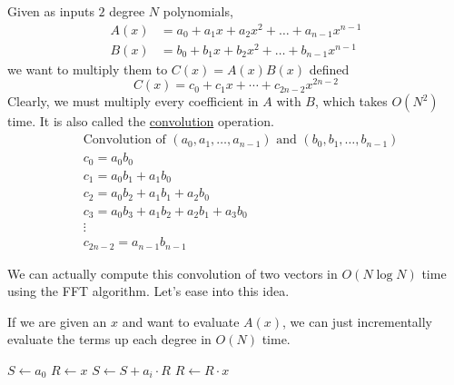   Given as inputs $2$ degree $N$ polynomials, 
  \begin{align}
    A(x) & = a_0 + a_1x + a_2x^2 + \ldots + a_{n-1}x^{n-1} \\
    B(x) & = b_0 + b_1x + b_2x^2 + \ldots + b_{n-1}x^{n-1} 
  \end{align}
  we want to multiply them to $C(x) = A (x) B(x)$ defined 
  \begin{equation}
    C(x) = c_0 + c_1x + \cdots + c_{2n-2}x^{2n-2} 
  \end{equation}
  Clearly, we must multiply every coefficient in $A$ with $B$, which takes $O(N^2)$ time. It is also called the \hyperref[prob-def:convolution]{convolution} operation. 
  \begin{align*}
    &\text{Convolution of } (a_0, a_1, \ldots, a_{n-1}) \text{ and } (b_0, b_1, \ldots, b_{n-1}) \\[1em]
    &c_0 = a_0 b_0 \\
    &c_1 = a_0 b_1 + a_1 b_0 \\
    &c_2 = a_0 b_2 + a_1 b_1 + a_2 b_0 \\
    &c_3 = a_0 b_3 + a_1 b_2 + a_2 b_1 + a_3 b_0 \\
    &\vdots \\
    &c_{2n-2} = a_{n-1} b_{n-1}
  \end{align*}

  We can actually compute this convolution of two vectors in $O(N \log{N})$ time using the FFT algorithm. Let's ease into this idea. 

  \begin{lemma}
    \label{thm:evaluating-a-polynomial-at-x}
    If we are given an $x$ and want to evaluate $A(x)$, we can just incrementally evaluate the terms up each degree in $O(N)$ time. 

    \begin{algorithm}[H]
      \caption{Evaluate polynomial $A(x)$ at $x=p$}
      \begin{algorithmic}[1]
      \State $S \gets a_0$
      \State $R \gets x$
          \State $S \gets S + a_i \cdot R$
          \State $R \gets R \cdot x$
      \EndFor
      \end{algorithmic}
    \end{algorithm}
  \end{lemma}


